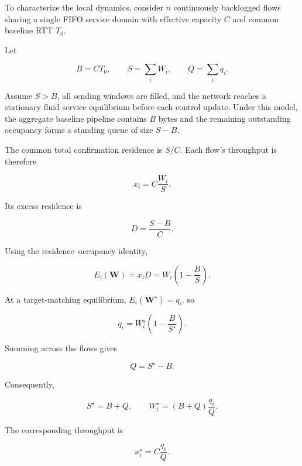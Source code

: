 To characterize the local dynamics, consider \(n\) continuously backlogged flows sharing a single FIFO service domain with effective capacity \(C\) and common baseline RTT \(T_0\).

Let

\begin{equation}
\label{eq:app-e-6}
B=CT_0,\qquad
S=\sum_iW_i,\qquad
Q=\sum_iq_i.
\end{equation}

Assume \(S>B\), all sending windows are filled, and the network reaches a stationary fluid service equilibrium before each control update. Under this model, the aggregate baseline pipeline contains \(B\) bytes and the remaining outstanding occupancy forms a standing queue of size \(S-B\).

The common total confirmation residence is \(S/C\). Each flow's throughput is therefore

\begin{equation}
\label{eq:app-e-7}
x_i=C\frac{W_i}{S}.
\end{equation}

Its excess residence is

\begin{equation}
\label{eq:app-e-8}
D=\frac{S-B}{C}.
\end{equation}

Using the residence–occupancy identity,

\begin{equation}
\label{eq:app-e-9}
\boxed{
E_i(\mathbf W)
=
x_iD
=
W_i\left(1-\frac BS\right).
}
\end{equation}

At a target-matching equilibrium, \(E_i(\mathbf W^\star)=q_i\), so

\begin{equation}
\label{eq:app-e-10}
q_i=W_i^\star\left(1-\frac{B}{S^\star}\right).
\end{equation}

Summing across the flows gives

\[
Q=S^\star-B.
\]

Consequently,

\begin{equation}
\label{eq:app-e-11}
\boxed{
S^\star=B+Q,
\qquad
W_i^\star=(B+Q)\frac{q_i}{Q}.
}
\end{equation}

The corresponding throughput is

\begin{equation}
\label{eq:app-e-12}
x_i^\star=C\frac{q_i}{Q}.
\end{equation}

